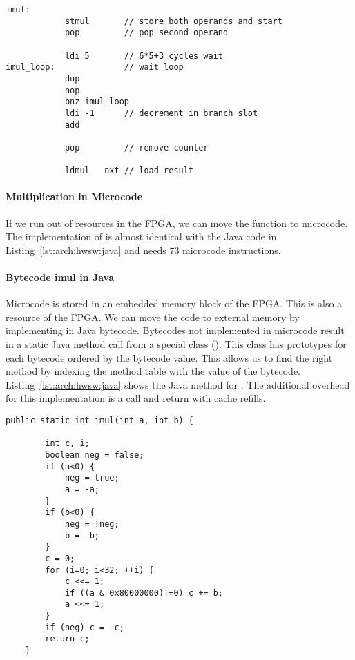 \begin{lstlisting}[float, caption={Microcode to access the Booth multiplier},
label=lst:arch:hwsw:micro]
    imul:
            stmul       // store both operands and start
            pop         // pop second operand

            ldi 5       // 6*5+3 cycles wait
imul_loop:              // wait loop
            dup
            nop
            bnz imul_loop
            ldi -1      // decrement in branch slot
            add

            pop         // remove counter

            ldmul   nxt // load result
\end{lstlisting}

\paragraph{Multiplication in Microcode}

If we run out of resources in the FPGA, we can move the function to
microcode. The implementation of  is almost identical
with the Java code in Listing~\ref{lst:arch:hwsw:java} and needs 73
microcode instructions.

\paragraph{Bytecode imul in Java}

Microcode is stored in an embedded memory block of the FPGA. This is
also a resource of the FPGA. We can move the code to external memory
by implementing  in Java bytecode. Bytecodes not
implemented in microcode result in a static Java method call from a
special class (). This class has
prototypes for each bytecode ordered by the bytecode value. This
allows us to find the right method by indexing the method table with
the value of the bytecode. Listing~\ref{lst:arch:hwsw:java} shows
the Java method for . The additional overhead for this
implementation is a call and return with cache refills.


\begin{lstlisting}[float, caption={Implementation of bytecode \code{imul} in Java},
label=lst:arch:hwsw:java]
    public static int imul(int a, int b) {

        int c, i;
        boolean neg = false;
        if (a<0) {
            neg = true;
            a = -a;
        }
        if (b<0) {
            neg = !neg;
            b = -b;
        }
        c = 0;
        for (i=0; i<32; ++i) {
            c <<= 1;
            if ((a & 0x80000000)!=0) c += b;
            a <<= 1;
        }
        if (neg) c = -c;
        return c;
    }
\end{lstlisting}

